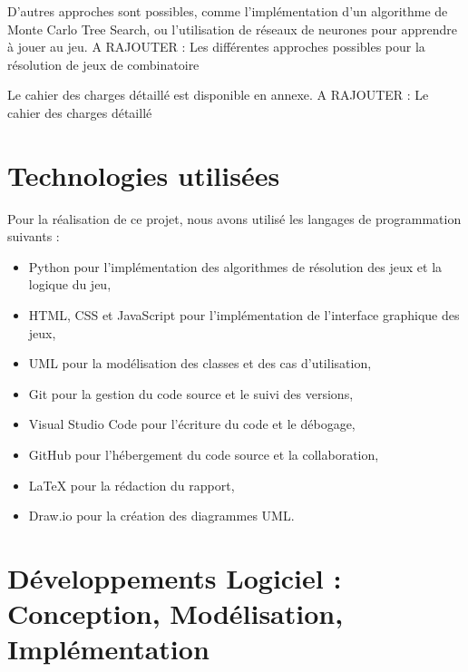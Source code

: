 \documentclass[a4paper]{article} %
\begin{document}
D'autres approches sont possibles, comme l'implémentation d'un algorithme de 
Monte Carlo Tree Search, ou l'utilisation de réseaux de neurones pour apprendre 
à jouer au jeu.
A RAJOUTER : Les différentes approches possibles pour la résolution de jeux de 
combinatoire

Le cahier des charges détaillé est disponible en annexe.
A RAJOUTER : Le cahier des charges détaillé

\section{Technologies utilisées}

Pour la réalisation de ce projet, nous avons utilisé les langages de programmation suivants :
\begin{itemize}
	\item Python pour l'implémentation des algorithmes de résolution des jeux et la logique du jeu,
	\item HTML, CSS et JavaScript pour l'implémentation de l'interface graphique des jeux,
	\item UML pour la modélisation des classes et des cas d'utilisation,
	\item Git pour la gestion du code source et le suivi des versions,
	\item Visual Studio Code pour l'écriture du code et le débogage,
	\item GitHub pour l'hébergement du code source et la collaboration,
	\item LaTeX pour la rédaction du rapport,
	\item Draw.io pour la création des diagrammes UML.
\end{itemize}


\section{Développements Logiciel : Conception, Modélisation, Implémentation} 



\end{document}
